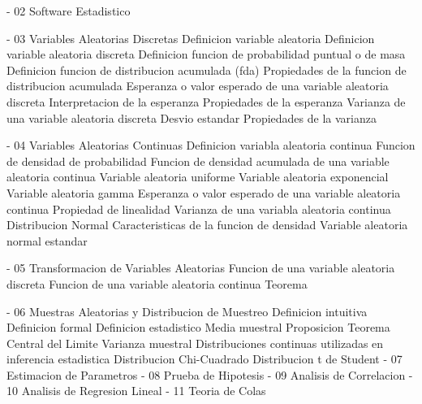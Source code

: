 {- 02 Software Estadistico

- 03 Variables Aleatorias Discretas
  Definicion variable aleatoria
  Definicion variable aleatoria discreta
  Definicion funcion de probabilidad puntual o de masa
  Definicion funcion de distribucion acumulada (fda)
  Propiedades de la funcion de distribucion acumulada
  Esperanza o valor esperado de una variable aleatoria discreta
  Interpretacion de la esperanza
  Propiedades de la esperanza
  Varianza de una variable aleatoria discreta
  Desvio estandar
  Propiedades de la varianza

- 04 Variables Aleatorias Continuas
  Definicion variabla aleatoria continua
  Funcion de densidad de probabilidad
  Funcion de densidad acumulada de una variable aleatoria continua
  Variable aleatoria uniforme
  Variable aleatoria exponencial
  Variable aleatoria gamma
  Esperanza o valor esperado de una variable aleatoria continua
  Propiedad de linealidad
  Varianza de una variabla aleatoria continua
  Distribucion Normal
  Caracteristicas de la funcion de densidad
  Variable aleatoria normal estandar

- 05 Transformacion de Variables Aleatorias
  Funcion de una variable aleatoria discreta
  Funcion de una variable aleatoria continua
  Teorema

- 06 Muestras Aleatorias y Distribucion de Muestreo
  Definicion intuitiva
  Definicion formal
  Definicion estadistico
  Media muestral
  Proposicion
  Teorema Central del Limite
  Varianza muestral
  Distribuciones continuas utilizadas en inferencia estadistica
  Distribucion Chi-Cuadrado
  Distribucion t de Student
- 07 Estimacion de Parametros
- 08 Prueba de Hipotesis
- 09 Analisis de Correlacion
- 10 Analisis de Regresion Lineal
- 11 Teoria de Colas
}